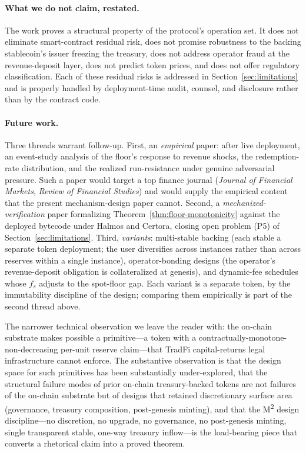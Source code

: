 \paragraph{What we do not claim, restated.} The work proves a structural property of the protocol's operation set. It does not eliminate smart-contract residual risk, does not promise robustness to the backing stablecoin's issuer freezing the treasury, does not address operator fraud at the revenue-deposit layer, does not predict token prices, and does not offer regulatory classification. Each of these residual risks is addressed in Section~\ref{sec:limitations} and is properly handled by deployment-time audit, counsel, and disclosure rather than by the contract code.

\paragraph{Future work.} Three threads warrant follow-up. First, an \emph{empirical} paper: after live deployment, an event-study analysis of the floor's response to revenue shocks, the redemption-rate distribution, and the realized run-resistance under genuine adversarial pressure. Such a paper would target a top finance journal (\emph{Journal of Financial Markets}, \emph{Review of Financial Studies}) and would supply the empirical content that the present mechanism-design paper cannot. Second, a \emph{mechanized-verification} paper formalizing Theorem~\ref{thm:floor-monotonicity} against the deployed bytecode under Halmos and Certora, closing open problem (P5) of Section~\ref{sec:limitations}. Third, \emph{variants}: multi-stable backing (each stable a separate token deployment; the user diversifies across instances rather than across reserves within a single instance), operator-bonding designs (the operator's revenue-deposit obligation is collateralized at genesis), and dynamic-fee schedules whose $f_s$ adjusts to the spot-floor gap. Each variant is a separate token, by the immutability discipline of the design; comparing them empirically is part of the second thread above.

The narrower technical observation we leave the reader with: the on-chain substrate makes possible a primitive---a token with a contractually-monotone-non-decreasing per-unit reserve claim---that TradFi capital-returns legal infrastructure cannot enforce. The substantive observation is that the design space for such primitives has been substantially under-explored, that the structural failure modes of prior on-chain treasury-backed tokens are not failures of the on-chain substrate but of designs that retained discretionary surface area (governance, treasury composition, post-genesis minting), and that the M\textsuperscript{2} design discipline---no discretion, no upgrade, no governance, no post-genesis minting, single transparent stable, one-way treasury inflow---is the load-bearing piece that converts a rhetorical claim into a proved theorem.
